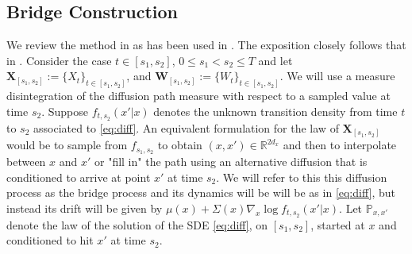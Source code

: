\documentclass[english,13pt]{article}
\numberwithin{equation}{section}
\begin{document}
\subsection{Bridge Construction}

We review the method in \cite{schauer,vd_meulen_guided_mcmc} as has been used in \cite{beskos}.
The exposition closely follows that in \cite{diff_bridge,beskos,non_synch}.
Consider the case $t\in[s_1,s_2]$, $0\leq s_1<s_2\leq T$ and let
$\mathbf{X}_{[s_1,s_2]}:=\{X_{t}\}_{t\in[s_1,s_2]}$, and $\mathbf{W}_{[s_1,s_2]}:=\{W_{t}\}_{t\in[s_1,s_2]}$.  
We will use a measure disintegration of the diffusion path measure with respect to a sampled value at time $s_2$.
Suppose $f_{t,s_{2}}(x'|x)$ denotes the unknown transition density from time $t$ to $s_2$ associated to \eqref{eq:diff}.
An equivalent formulation for the law of $\mathbf{X}_{[s_1,s_2]}$ would be to sample from $f_{s_1,s_2}$ to obtain $(x, x')\in \mathbb{R}^{2d_x}$ and then to interpolate between $x$ and $x'$ or "fill in" the path using an alternative diffusion that is conditioned to 
arrive at point $x'$ at time $s_2$. 
We will refer to this this diffusion process as the bridge process and its dynamics will be will be as in \eqref{eq:diff}, but instead its drift will be given by $\mu(x)+\Sigma(x)\nabla_x\log{f}_{t,s_2}(x'|x)$.
Let $\mathbb{P}_{x,x'}$ denote the law of the solution of the SDE \eqref{eq:diff}, on $[s_1,s_2]$, started at $x$ and conditioned to hit $x'$ at time $s_2$.
\end{document}
